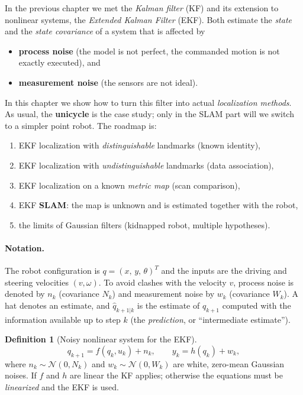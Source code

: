 \documentclass[11pt,a4paper]{article}
\def\bm#1{#1}%
\theoremstyle{definition}
\newtheorem{definition}{Definition}[section]
\theoremstyle{plain}
\theoremstyle{remark}
\begin{document}
In the previous chapter we met the \emph{Kalman filter} (KF) and its extension to nonlinear systems, the \emph{Extended Kalman Filter} (EKF). Both estimate the \emph{state} and the \emph{state covariance} of a system that is affected by
\begin{itemize}
  \item \textbf{process noise} (the model is not perfect, the commanded motion is not exactly executed), and
  \item \textbf{measurement noise} (the sensors are not ideal).
\end{itemize}
In this chapter we show how to turn this filter into actual \emph{localization methods}. As usual, the \textbf{unicycle} is the case study; only in the SLAM part will we switch to a simpler point robot. The roadmap is:
\begin{enumerate}[label=\arabic*.]
  \item EKF localization with \emph{distinguishable} landmarks (known identity),
  \item EKF localization with \emph{undistinguishable} landmarks (data association),
  \item EKF localization on a known \emph{metric map} (scan comparison),
  \item EKF \textbf{SLAM}: the map is unknown and is estimated together with the robot,
  \item the limits of Gaussian filters (kidnapped robot, multiple hypotheses).
\end{enumerate}

\paragraph{Notation.} The robot configuration is $\bm q=(x,\,y,\,\theta)^T$ and the inputs are the driving and steering velocities $(v,\omega)$. To avoid clashes with the velocity $v$, process noise is denoted by $\bm n_k$ (covariance $\bm N_k$) and measurement noise by $\bm w_k$ (covariance $\bm W_k$). A hat denotes an estimate, and $\hat{\bm q}_{k+1|k}$ is the estimate of $\bm q_{k+1}$ computed with the information available up to step $k$ (the \emph{prediction}, or ``intermediate estimate'').

\begin{definition}[Noisy nonlinear system for the EKF]
\label{def:system}
\[
\bm q_{k+1}=\bm f(\bm q_k,\bm u_k)+\bm n_k,\qquad 
\bm y_k=\bm h(\bm q_k)+\bm w_k ,
\]
where $\bm n_k\sim\mathcal N(\bm 0,\bm N_k)$ and $\bm w_k\sim\mathcal N(\bm 0,\bm W_k)$ are white, zero-mean Gaussian noises. If $\bm f$ and $\bm h$ are linear the KF applies; otherwise the equations must be \emph{linearized} and the EKF is used.
\end{definition}
\end{document}
